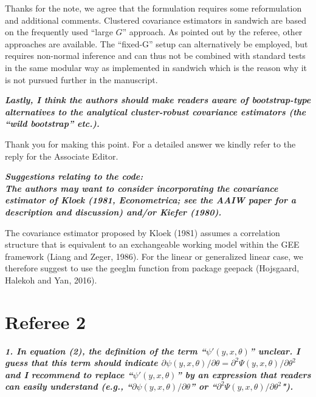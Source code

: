\documentclass[10pt,a4paper]{article}
\begin{document}
\medskip

Thanks for the note, we agree that the formulation requires some reformulation and additional comments. Clustered covariance estimators in sandwich are based on the frequently used ``large $G$'' approach. As pointed out by the referee, other approaches are available. The ``fixed-G'' setup can alternatively be employed, but requires non-normal inference and can thus not be combined with standard tests in the same modular way as implemented in sandwich which is the reason why it is not pursued further in the manuscript.

\medskip

\textbf{\textit{Lastly, I think the authors should make readers aware of bootstrap-type alternatives to the analytical cluster-robust covariance estimators (the ``wild bootstrap'' etc.).}}

\medskip

Thank you for making this point. For a detailed answer we kindly refer to the reply for the Associate Editor. 

\medskip

\textbf{\textit{Suggestions relating to the code:
\\
The authors may want to consider incorporating the  covariance estimator of Kloek (1981, Econometrica; see the AAIW paper for a description and discussion) and/or Kiefer (1980).}}

\medskip

The covariance estimator proposed by Kloek (1981) assumes a correlation structure that is equivalent to an exchangeable working model within the GEE framework (Liang and Zeger, 1986).
For the linear or generalized linear case, we therefore suggest to use the geeglm function from package geepack (Hojsgaard, Halekoh and Yan, 2016).

\section*{Referee 2}

\textbf{\textit{1. In equation (2), the definition of the term ``$\psi'(y, x, \theta)$'' unclear.
I guess that this term should indicate $\partial \psi(y, x, \theta)/\partial\theta = \partial^2\Psi(y, x, \theta)/\partial\theta^2$ and I recommend to replace ``$\psi'(y, x, \theta)$''
by an expression that readers can easily understand
(e.g., ``$\partial \psi(y, x, \theta)/\partial\theta$'' or ``$\partial^2\Psi(y, x, \theta)/\partial\theta^2$").}}

\medskip
\end{document}
